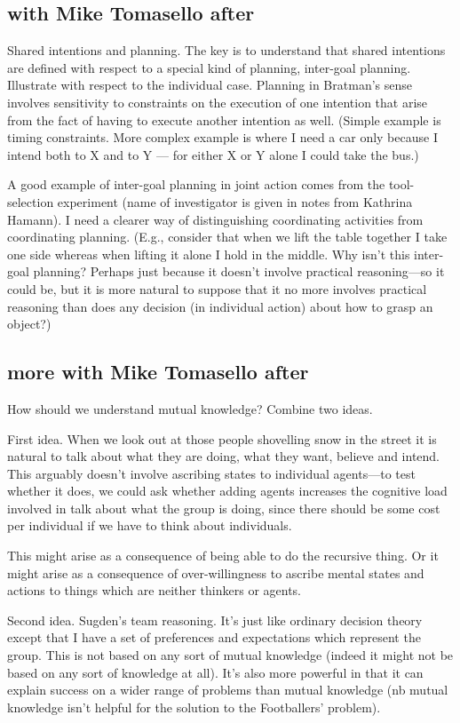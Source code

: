 \documentclass[14pt,a4paper]{extarticle}
\begin{document}
\subsection{with Mike Tomasello after}
Shared intentions and planning.  The key is to understand that shared intentions are defined with respect to a special kind of planning, inter-goal planning.  Illustrate with respect to the individual case.  Planning in Bratman's sense involves sensitivity to constraints on the execution of one intention that arise from the fact of having to execute another intention as well.  (Simple example is timing constraints.  More complex example is where I need a car only because I intend both to X and to Y --- for either X or Y alone I could take the bus.)  

A good example of inter-goal planning in joint action comes from the tool-selection experiment (name of investigator is given in notes from Kathrina Hamann).  I need a clearer way of distinguishing coordinating activities from coordinating planning.  (E.g., consider that when we lift the table together I take one side whereas when lifting it alone I hold in the middle.  Why isn't this inter-goal planning?  Perhaps just because it doesn't involve practical reasoning---so it could be, but it is more natural to suppose that it no more involves practical reasoning than does any decision (in individual action) about how to grasp an object?)


\subsection{more with Mike Tomasello after}
How should we understand mutual knowledge?  Combine two ideas.  

First idea.  When we look out at those people shovelling snow in the street it is natural to talk about what they are doing, what they want, believe and intend.  This arguably doesn't involve ascribing states to individual agents---to test whether it does, we could ask whether adding agents increases the cognitive load involved in talk about what the group is doing, since there should be some cost per individual if we have to think about individuals.

This might arise as a consequence of being able to do the recursive thing.  Or it might arise as a consequence of over-willingness to ascribe mental states and actions to things which are neither thinkers or agents.

Second idea.  Sugden's team reasoning.  It's just like ordinary decision theory except that I have a set of preferences and expectations which represent the group.  This is not based on any sort of mutual knowledge (indeed it might not be based on any sort of knowledge at all).  It's also more powerful in that it can explain success on a wider range of problems than mutual knowledge (nb mutual knowledge isn't helpful for the solution to the Footballers' problem).
\end{document}
